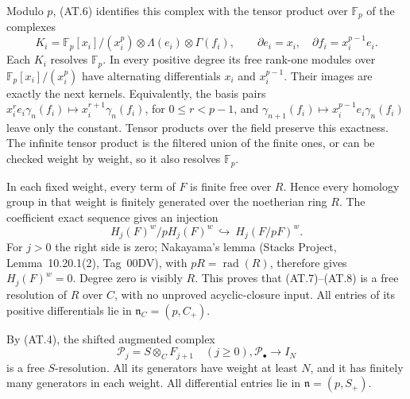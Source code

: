 Modulo \(p\), (AT.6) identifies this complex with the tensor
product over \(\mathbb F_p\) of the complexes
\[
 K_i=\mathbb F_p[x_i]/(x_i^p)\otimes\Lambda(e_i)
                        \otimes\Gamma(f_i),
 \qquad \partial e_i=x_i,
 \quad \partial f_i=x_i^{p-1}e_i.                        \tag{AT.9}
\]
Each \(K_i\) resolves \(\mathbb F_p\). In every positive
degree its free rank-one modules over
\(\mathbb F_p[x_i]/(x_i^p)\) have alternating differentials
\(x_i\) and \(x_i^{p-1}\). Their images are exactly the
next kernels. Equivalently, the basis pairs
\(x_i^r e_i\gamma_n(f_i)\mapsto
  x_i^{r+1}\gamma_n(f_i)\), for \(0\leq r<p-1\),
and \(\gamma_{n+1}(f_i)\mapsto
  x_i^{p-1}e_i\gamma_n(f_i)\) leave only the constant.
Tensor products over the field preserve this exactness. The
infinite tensor product is the filtered union of the finite
ones, or can be checked weight by weight, so it also resolves
\(\mathbb F_p\).

In each fixed weight, every term of \(F\) is finite free
over \(R\). Hence every homology group in that weight is
finitely generated over the noetherian ring \(R\).
The coefficient exact sequence gives an injection
\[
 H_j(F)^w/pH_j(F)^w\ \hookrightarrow\ H_j(F/pF)^w.
\]
For \(j>0\) the right side is zero; Nakayama's lemma
(Stacks Project, Lemma~10.20.1(2), Tag~00DV), with
\(pR=\operatorname{rad}(R)\), therefore gives \(H_j(F)^w=0\). Degree zero is visibly
\(R\). This proves that (AT.7)--(AT.8) is a free resolution
of \(R\) over \(C\), with no unproved acyclic-closure input.
All entries of its positive differentials lie in
\(\mathfrak n_C=(p,C_+)\).

By (AT.4), the shifted augmented complex
\[
 \mathcal P_j=S\otimes_C F_{j+1}\quad(j\geq0),
                         \mathcal P_\bullet\to I_N       \tag{AT.10}
\]
is a free \(S\)-resolution. All its generators have weight
at least \(N\), and it has finitely many generators in each
weight. All differential entries lie in
\(\mathfrak n=(p,S_+)\).

